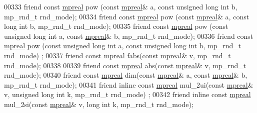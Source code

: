 \begin{DoxyCode}
00333     \textcolor{keyword}{friend} \textcolor{keyword}{const} \hyperlink{classmpfr_1_1mpreal}{mpreal} pow (\textcolor{keyword}{const} \hyperlink{classmpfr_1_1mpreal}{mpreal}& a, \textcolor{keyword}{const} \textcolor{keywordtype}{unsigned} \textcolor{keywordtype}{long} \textcolor{keywordtype}{int} b, mp\_rnd\_t rnd\_mode);
00334     \textcolor{keyword}{friend} \textcolor{keyword}{const} \hyperlink{classmpfr_1_1mpreal}{mpreal} pow (\textcolor{keyword}{const} \hyperlink{classmpfr_1_1mpreal}{mpreal}& a, \textcolor{keyword}{const} \textcolor{keywordtype}{long} \textcolor{keywordtype}{int} b, mp\_rnd\_t rnd\_mode);
00335     \textcolor{keyword}{friend} \textcolor{keyword}{const} \hyperlink{classmpfr_1_1mpreal}{mpreal} pow (\textcolor{keyword}{const} \textcolor{keywordtype}{unsigned} \textcolor{keywordtype}{long} \textcolor{keywordtype}{int} a, \textcolor{keyword}{const} \hyperlink{classmpfr_1_1mpreal}{mpreal}& b, mp\_rnd\_t rnd\_mode);
00336     \textcolor{keyword}{friend} \textcolor{keyword}{const} \hyperlink{classmpfr_1_1mpreal}{mpreal} pow (\textcolor{keyword}{const} \textcolor{keywordtype}{unsigned} \textcolor{keywordtype}{long} \textcolor{keywordtype}{int} a, \textcolor{keyword}{const} \textcolor{keywordtype}{unsigned} \textcolor{keywordtype}{long} \textcolor{keywordtype}{int} b, mp\_rnd\_t rnd\_mode)
      ;
00337     \textcolor{keyword}{friend} \textcolor{keyword}{const} \hyperlink{classmpfr_1_1mpreal}{mpreal} fabs(\textcolor{keyword}{const} \hyperlink{classmpfr_1_1mpreal}{mpreal}& v, mp\_rnd\_t rnd\_mode);
00338 
00339     \textcolor{keyword}{friend} \textcolor{keyword}{const} \hyperlink{classmpfr_1_1mpreal}{mpreal} abs(\textcolor{keyword}{const} \hyperlink{classmpfr_1_1mpreal}{mpreal}& v, mp\_rnd\_t rnd\_mode);
00340     \textcolor{keyword}{friend} \textcolor{keyword}{const} \hyperlink{classmpfr_1_1mpreal}{mpreal} dim(\textcolor{keyword}{const} \hyperlink{classmpfr_1_1mpreal}{mpreal}& a, \textcolor{keyword}{const} \hyperlink{classmpfr_1_1mpreal}{mpreal}& b, mp\_rnd\_t rnd\_mode);
00341     \textcolor{keyword}{friend} \textcolor{keyword}{inline} \textcolor{keyword}{const} \hyperlink{classmpfr_1_1mpreal}{mpreal} mul\_2ui(\textcolor{keyword}{const} \hyperlink{classmpfr_1_1mpreal}{mpreal}& v, \textcolor{keywordtype}{unsigned} \textcolor{keywordtype}{long} \textcolor{keywordtype}{int} k, mp\_rnd\_t rnd\_mode)
      ;
00342     \textcolor{keyword}{friend} \textcolor{keyword}{inline} \textcolor{keyword}{const} \hyperlink{classmpfr_1_1mpreal}{mpreal} mul\_2si(\textcolor{keyword}{const} \hyperlink{classmpfr_1_1mpreal}{mpreal}& v, \textcolor{keywordtype}{long} \textcolor{keywordtype}{int} k, mp\_rnd\_t rnd\_mode);

\end{DoxyCode}
